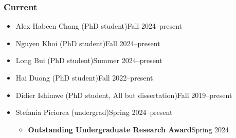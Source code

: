 \documentclass[11pt]{article}
\begin{document}
\newcommand{\didier}{
\item Didier Ishimwe (PhD student, All but dissertation)\hfill Fall 2019--present
}

\newcommand{\habeen}{
\item Alex Habeen Chang (PhD student)\hfill Fall 2024--present
}

\newcommand{\haiduong}{
\item Hai Duong (PhD student)\hfill Fall 2022--present
}

\newcommand{\longbui}{
\item Long Bui (PhD student)\hfill Summer 2024--present
}

\newcommand{\nguyenkhoi}{
\item Nguyen Khoi (PhD student)\hfill Fall 2024--present
}

\newcommand{\stefaniapiciorea}{
\item Stefania Piciorea (undergrad)\hfill Spring 2024--present
\begin{itemize}[before=\small]
    \item \textbf{Outstanding Undergraduate Research Award}\hfill Spring 2024
\end{itemize}
}


\subsubsection{Current}
\begin{itemize}
    \habeen{}
    \nguyenkhoi{}
    \longbui{}
    \haiduong{}
    \linhan{}
    \didier{}
    \stefaniapiciorea{}
\end{itemize}
\end{document}
